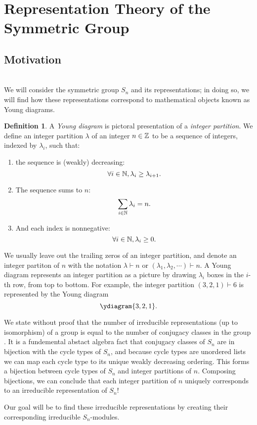 \documentclass[12pt,twoside]{reedthesis}
\theoremstyle{plain}   %
\theoremstyle{definition}
\newtheorem{defn}{Definition}[section]
\theoremstyle{remark}
\numberwithin{equation}{section}
\begin{document}
  \section{Representation Theory of the Symmetric Group}
  \subsection{Motivation}\label{motivation} \hfill\\
  We will consider the symmetric group $S_n$ and its representations; in doing so, we will find how these representations correspond to mathematical objects known as Young diagrams.
  \begin{defn}
    A \emph{Young diagram} is pictoral presentation of a \emph{integer partition}.
    We define an integer partition $\lambda$ of an integer $n \in \mathbb{Z}$ to be a sequence of integers, indexed by $\lambda_i$, such that:
    \begin{enumerate}
    \item the sequence is (weakly) decreasing:
      \[\forall i \in \mathbb{N}, \lambda_i \geq \lambda_{i+1}.\]
    \item
      The sequence sums to $n$:
      \[ \sum_{i \in \mathbb{N}} \lambda_i = n. \]
    \item
      And each index is nonnegative:
      \[\forall i \in \mathbb{N}, \lambda_i \geq 0.\]
    \end{enumerate}
    We usually leave out the trailing zeros of an integer partition, and denote an integer partiton of $n$ with the notation $\lambda \vdash n$ or $(\lambda_1,\lambda_2,\cdots) \vdash n$.
    A Young diagram represents an integer partition as a picture by drawing $\lambda_i$ boxes in the $i$-th row, from top to bottom.
    For example, the integer partition $(3,2,1) \vdash 6$ is represented by the Young diagram
    \[
      \ydiagram{3,2,1}.
    \]
  \end{defn}
  \par
  We state without proof that the number of irreducible representations (up to isomorphism) of a group is equal to the number of conjugacy classes in
  the group \cite[Proposition 1.10.1]{sagan} . It is a fundemental abstact algebra fact that 
  conjugacy classes of $S_n$ are in bijection with the cycle types of $S_n$,
  and because cycle types are unordered lists we can map each cycle type to its unique weakly decreasing ordering.
  This forms a bijection between cycle types of $S_n$ and integer partitions of $n$.
  Composing bijections, we can conclude that each integer partition of $n$ uniquely corresponds to an irreducible representation of $S_n$! \par
  Our goal will be to find these irreducible representations by creating their corresponding irreducible $S_n$-modules.
\end{document}
